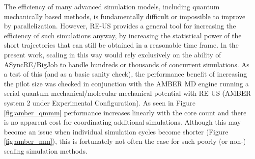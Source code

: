 The efficiency of many advanced simulation models, including quantum 
mechanically based methods, is fundamentally difficult or impossible to improve 
by parallelization. However, RE-US provides a general tool for increasing the
efficiency of such simulations anyway, by increasing the statistical power of
the short trajectories that can still be obtained in a reasonable time frame.
In the present work, scaling in this way would rely exclusively on the ability 
of ASyncRE/BigJob to handle hundreds or thousands of concurrent simulations.
As a test of this (and as a basic sanity check), the performance benefit of 
increasing the pilot size was checked in conjunction with the AMBER MD engine
running a serial quantum mechanical/molecular mechanical potential with RE-US
(AMBER system 2 under Experimental Configuration). As seen in Figure 
\ref{fig:amber_qmmm} performance increases linearly with the core count and
there is no apparent cost for coordinating additional simulations. Although 
this may become an issue when individual simulation cycles become shorter
(Figure \ref{fig:amber_mm}), this is fortunately not often the case for such 
poorly (or non-) scaling simulation methods.
